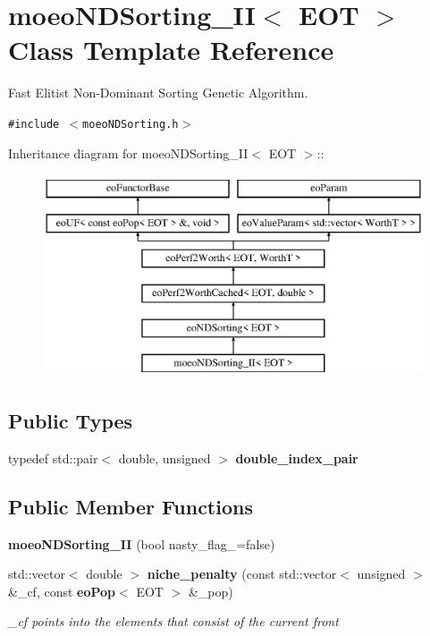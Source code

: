 \section{moeo\-NDSorting\_\-II$<$ EOT $>$ Class Template Reference}
\label{classmoeoNDSorting__II}
Fast Elitist Non-Dominant Sorting Genetic Algorithm.  


{\tt \#include $<$moeo\-NDSorting.h$>$}

Inheritance diagram for moeo\-NDSorting\_\-II$<$ EOT $>$::\begin{figure}[H]
\begin{center}
\leavevmode
\includegraphics[height=6cm]{classmoeoNDSorting__II}
\end{center}
\end{figure}
\subsection*{Public Types}
\begin{CompactItemize}
\item 
typedef std::pair$<$ double, unsigned $>$ {\bf double\_\-index\_\-pair}\label{classmoeoNDSorting__II_6703325377eec015f475e944dc75097d}

\end{CompactItemize}
\subsection*{Public Member Functions}
\begin{CompactItemize}
\item 
{\bf moeo\-NDSorting\_\-II} (bool nasty\_\-flag\_\-=false)\label{classmoeoNDSorting__II_820e9987853858ddc59e36c7f267955e}

\item 
std::vector$<$ double $>$ {\bf niche\_\-penalty} (const std::vector$<$ unsigned $>$ \&\_\-cf, const {\bf eo\-Pop}$<$ EOT $>$ \&\_\-pop)\label{classmoeoNDSorting__II_d24d8008d6928aeaeeb59791cb4059fc}

\begin{CompactList}\small\item\em \_\-cf points into the elements that consist of the current front \item\end{CompactList}\end{CompactItemize}
